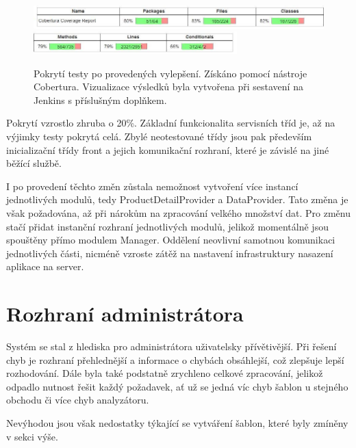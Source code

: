 \documentclass[thesis=B,czech]{FITthesis}[2012/06/26]
\begin{document}
\begin{figure}[h]\centering
 	\includegraphics[width=1.0\textwidth]{resources/cobertura-report-new-1}
 	\includegraphics[width=0.7\textwidth]{resources/cobertura-report-new-2}
	\caption[Pokrytí testy po provedených vylepšení]{Pokrytí testy po provedených vylepšení. Získáno pomocí nástroje Cobertura. Vizualizace
	výsledků byla vytvořena při sestavení na Jenkins s příslušným doplňkem.}\label{fig:cober-new}
\end{figure}

Pokrytí vzrostlo zhruba o 20\%. Základní funkcionalita servisních tříd je, až na výjimky testy pokrytá celá.
Zbylé neotestované třídy jsou pak především inicializační třídy front a jejich komunikační rozhraní, které je závislé na jiné běžící službě.
\par
I po provedení těchto změn zůstala nemožnost vytvoření více instancí jednotlivých modulů, tedy ProductDetailProvider a DataProvider.
Tato změna je však požadována, až při nárokům na zpracování velkého množství dat. Pro změnu stačí přidat instanční rozhraní jednotlivých modulů, jelikož momentálně jsou spouštěny přímo modulem Manager. Oddělení neovlivní samotnou komunikaci jednotlivých části, nicméně 
vzroste zátěž na nastavení infrastruktury nasazení aplikace na server.

\section{Rozhraní administrátora}
Systém se stal z hlediska pro administrátora uživatelsky přívětivější. Při řešení chyb je rozhraní přehlednější a informace o chybách
obsáhlejší, což zlepšuje lepší rozhodování. Dále byla také podstatně zrychleno celkové zpracování, jelikož odpadlo nutnost řešit
každý požadavek, ať už se jedná víc chyb šablon u stejného obchodu či více chyb analyzátoru.
\par 
Nevýhodou jsou však nedostatky týkající se vytváření šablon, které byly zmíněny v sekci výše.
\end{document}
